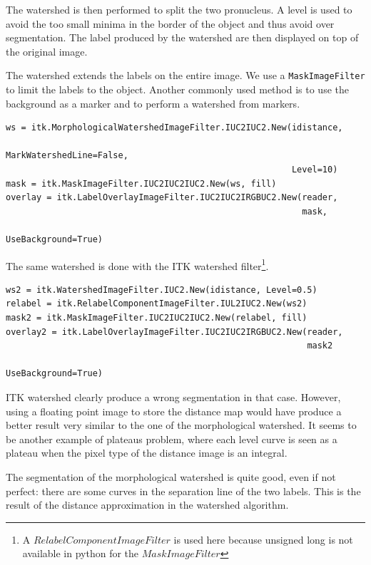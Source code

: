 \documentclass{InsightArticle}
\begin{document}
The watershed is then performed to split the two pronucleus. A level
is used to avoid the too small minima in the border of the object and thus
avoid over segmentation. The label produced by the watershed are then
displayed on top of the original image.

The watershed extends the labels on the entire image. We use a
\verb$MaskImageFilter$ to limit the labels to the object. Another commonly
used method is to use the background as a marker and to perform a watershed
from markers.

\small \begin{verbatim}
ws = itk.MorphologicalWatershedImageFilter.IUC2IUC2.New(idistance,
                                                        MarkWatershedLine=False,
                                                        Level=10)
mask = itk.MaskImageFilter.IUC2IUC2IUC2.New(ws, fill)
overlay = itk.LabelOverlayImageFilter.IUC2IUC2IRGBUC2.New(reader,
                                                          mask,
                                                          UseBackground=True)
\end{verbatim} \normalsize

The same watershed is done with the ITK watershed filter\footnote{A
$RelabelComponentImageFilter$ is used here because unsigned long is
not available in python for the $MaskImageFilter$}.

\small \begin{verbatim}
ws2 = itk.WatershedImageFilter.IUC2.New(idistance, Level=0.5)
relabel = itk.RelabelComponentImageFilter.IUL2IUC2.New(ws2)
mask2 = itk.MaskImageFilter.IUC2IUC2IUC2.New(relabel, fill)
overlay2 = itk.LabelOverlayImageFilter.IUC2IUC2IRGBUC2.New(reader,
                                                           mask2
                                                           UseBackground=True)
\end{verbatim} \normalsize

ITK watershed clearly produce a wrong segmentation in that case. However, using
a floating point image to store the distance map would have produce a better
result very similar to the one of the morphological watershed. It seems to be
another example of plateaus problem, where each level curve is seen as a plateau
when the pixel type of the distance image is an integral.

The segmentation of the morphological watershed is quite good, even if not perfect:
there are some curves in the separation line of the two labels. This is the
result of the distance approximation in the watershed algorithm.
\end{document}
